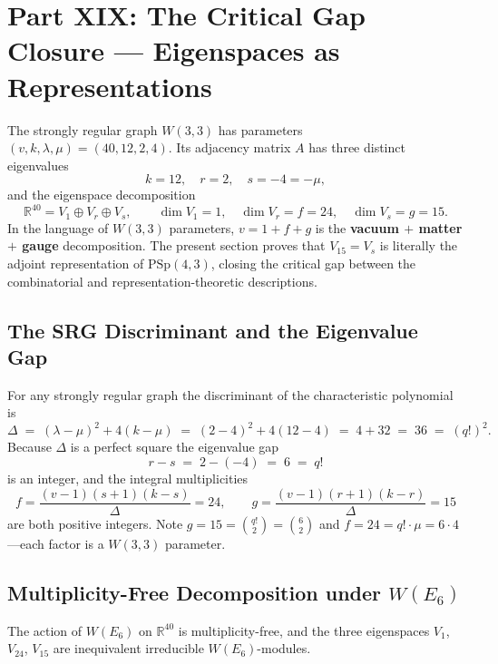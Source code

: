 \section{Part XIX: The Critical Gap Closure --- Eigenspaces as Representations}

The strongly regular graph $W(3,3)$ has parameters $(v, k, \lambda, \mu) = (40, 12, 2, 4)$.
Its adjacency matrix $A$ has three distinct eigenvalues
\[
  k = 12, \quad r = 2, \quad s = -4 = -\mu,
\]
and the eigenspace decomposition
\[
  \mathbb{R}^{40} = V_1 \oplus V_{r} \oplus V_{s}, \qquad
  \dim V_1 = 1,\quad \dim V_r = f = 24,\quad \dim V_s = g = 15.
\]
In the language of $W(3,3)$ parameters, $v = 1 + f + g$ is the
\textbf{vacuum $+$ matter $+$ gauge} decomposition.  The present section proves that
$V_{15} = V_s$ is literally the adjoint representation of $\mathrm{PSp}(4,3)$,
closing the critical gap between the combinatorial and representation-theoretic
descriptions.

\subsection{The SRG Discriminant and the Eigenvalue Gap}

For any strongly regular graph the discriminant of the characteristic polynomial is
\[
  \Delta \;=\; (\lambda - \mu)^2 + 4(k - \mu)
           \;=\; (2-4)^2 + 4(12-4) \;=\; 4 + 32 \;=\; 36 \;=\; (q!)^2.
\]
Because $\Delta$ is a perfect square the eigenvalue gap
\[
  r - s \;=\; 2 - (-4) \;=\; 6 \;=\; q!
\]
is an integer, and the integral multiplicities
\[
  f = \frac{(v-1)(s+1)(k-s)}{\Delta} = 24, \qquad
  g = \frac{(v-1)(r+1)(k-r)}{\Delta} = 15
\]
are both positive integers.  Note $g = 15 = \binom{q!}{2} = \binom{6}{2}$ and
$f = 24 = q! \cdot \mu = 6 \cdot 4$---each factor is a $W(3,3)$ parameter.

\subsection{Multiplicity-Free Decomposition under $W(E_6)$}

\begin{theorem}
The action of $W(E_6)$ on $\mathbb{R}^{40}$ is multiplicity-free, and the
three eigenspaces $V_1$, $V_{24}$, $V_{15}$ are inequivalent irreducible
$W(E_6)$-modules.
\end{theorem}

